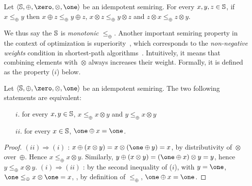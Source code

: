 \begin{lemma} \label{lem:monotonic}
Let $\< \Semiring, \oplus, \zero, \otimes, \one>$ be an idempotent semiring.
For every $x, y, z  \in \mathbb{S}$,
if $x \leq_\oplus y$ then
$x \oplus z \leq_\oplus y \oplus z$,
$x \otimes z \leq_\oplus y \otimes z$
and $z \otimes x \leq_\oplus z \otimes y$.
\end{lemma}

We thus say the
$\mathbb{S}$ is \emph{monotonic} \wrt $\leq_\oplus$.
%
Another important semiring property in the context of optimization
is {superiority}~\cite{Huang08advanceddynamic},
which corresponds to the
\emph{non-negative weights} condition in shortest-path algorithms~\cite{Dijkstra59anote}.
Intuitively, it means that combining elements with~$\otimes$ always increases their weight.
Formally, it is defined as the property ($i$) below. %

\begin{lemma}
\label{lem:superior}\label{lem:bounded}
Let $\< \Semiring, \oplus, \zero, \otimes, \one>$ be an idempotent semiring.
The two following statements are equivalent:
\begin{itemize}
\item [$i.$] for every $x, y \in \mathbb{S}$,
$x \leq_\oplus x \otimes y$ and
$y \leq_\oplus x \otimes y$
\item[$ii.$] for every $x \in \mathbb{S}$,  $\one \oplus x = \one$.
\end{itemize}
\end{lemma}
%
\begin{proof} %
$(ii) \Rightarrow (i)$ :
$x \oplus (x \otimes y) = x \otimes (\one \oplus y) = x$,
by distributivity of~$\otimes$ over~$\oplus$.
Hence $x \leq_\oplus x \otimes y$.
Similarly, $y \oplus (x \otimes y) = (\one \oplus x) \otimes y = y$,
hence $y \leq_\oplus x \otimes y$.
%
$(i) \Rightarrow (ii)$ :
by the second inequality of ($i$), with $y = \one$,
$\one \leq_\oplus x \otimes \one = x$, \ie,
by definition of $\leq_\oplus$, $\one \oplus x = \one$.
\end{proof}

